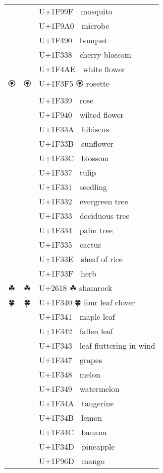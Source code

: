\documentclass[a4paper,12pt]{ltjarticle}
\newcommand{\fontA}[1]{{\fontspec[RawFeature={mode=harf,+dist,+ccmp}]{Segoe UI Emoji} #1}}
\newcommand{\fontB}[1]{{\fontspec[RawFeature={mode=harf,+dist,+ccmp}]{Noto Color Emoji} #1}}
\begin{document}
\begin{longtable}[c]{ccp{0.8\linewidth}}
\fontA{🦟}&\fontB{🦟}&U+1F99F 🦟 mosquito\\
\fontA{🦠}&\fontB{🦠}&U+1F9A0 🦠 microbe\\
\fontA{💐}&\fontB{💐}&U+1F490 💐 bouquet\\
\fontA{🌸}&\fontB{🌸}&U+1F338 🌸 cherry blossom\\
\fontA{💮}&\fontB{💮}&U+1F4AE 💮 white flower\\
\fontA{🏵}&\fontB{🏵}&U+1F3F5 🏵 rosette\\
\fontA{🌹}&\fontB{🌹}&U+1F339 🌹 rose\\
\fontA{🥀}&\fontB{🥀}&U+1F940 🥀 wilted flower\\
\fontA{🌺}&\fontB{🌺}&U+1F33A 🌺 hibiscus\\
\fontA{🌻}&\fontB{🌻}&U+1F33B 🌻 sunflower\\
\fontA{🌼}&\fontB{🌼}&U+1F33C 🌼 blossom\\
\fontA{🌷}&\fontB{🌷}&U+1F337 🌷 tulip\\
\fontA{🌱}&\fontB{🌱}&U+1F331 🌱 seedling\\
\fontA{🌲}&\fontB{🌲}&U+1F332 🌲 evergreen tree\\
\fontA{🌳}&\fontB{🌳}&U+1F333 🌳 deciduous tree\\
\fontA{🌴}&\fontB{🌴}&U+1F334 🌴 palm tree\\
\fontA{🌵}&\fontB{🌵}&U+1F335 🌵 cactus\\
\fontA{🌾}&\fontB{🌾}&U+1F33E 🌾 sheaf of rice\\
\fontA{🌿}&\fontB{🌿}&U+1F33F 🌿 herb\\
\fontA{☘}&\fontB{☘}&U+2618 ☘ shamrock\\
\fontA{🍀}&\fontB{🍀}&U+1F340 🍀 four leaf clover\\
\fontA{🍁}&\fontB{🍁}&U+1F341 🍁 maple leaf\\
\fontA{🍂}&\fontB{🍂}&U+1F342 🍂 fallen leaf\\
\fontA{🍃}&\fontB{🍃}&U+1F343 🍃 leaf fluttering in wind\\
\fontA{🍇}&\fontB{🍇}&U+1F347 🍇 grapes\\
\fontA{🍈}&\fontB{🍈}&U+1F348 🍈 melon\\
\fontA{🍉}&\fontB{🍉}&U+1F349 🍉 watermelon\\
\fontA{🍊}&\fontB{🍊}&U+1F34A 🍊 tangerine\\
\fontA{🍋}&\fontB{🍋}&U+1F34B 🍋 lemon\\
\fontA{🍌}&\fontB{🍌}&U+1F34C 🍌 banana\\
\fontA{🍍}&\fontB{🍍}&U+1F34D 🍍 pineapple\\
\fontA{🥭}&\fontB{🥭}&U+1F96D 🥭 mango\\

\end{longtable}
\end{document}
